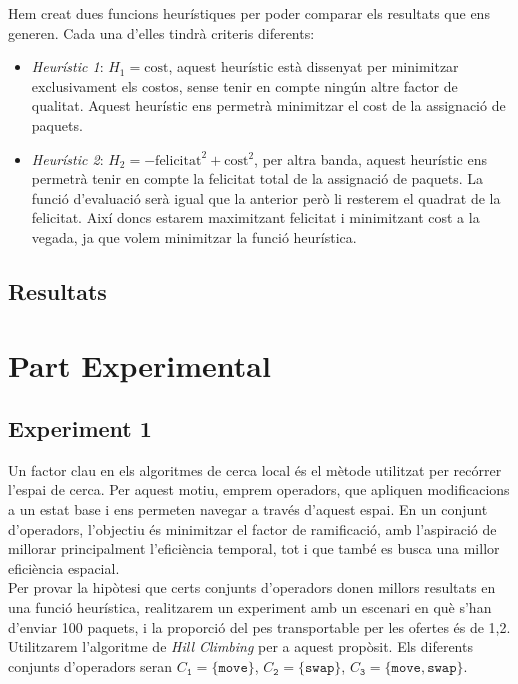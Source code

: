 \documentclass[a4paper]{article}
\begin{document}
	Hem creat dues funcions heurístiques per poder comparar els resultats que ens generen. Cada una d'elles tindrà criteris diferents:
	
	\begin{itemize}
		\item \emph{Heurístic 1}: $H_1 = \text{cost}$, aquest heurístic està dissenyat per minimitzar exclusivament els costos, sense tenir en compte ningún altre factor de qualitat. Aquest heurístic ens permetrà minimitzar el cost de la assignació de paquets.
		\item \emph{Heurístic 2}: $H_2 = -\text{felicitat}^2 + \text{cost}^2$, per altra banda, aquest heurístic ens permetrà tenir en compte la felicitat total de la assignació de paquets. La funció d'evaluació serà igual que la anterior però li resterem el quadrat de la  felicitat. Així doncs estarem maximitzant felicitat i minimitzant cost a la vegada, ja que volem minimitzar la funció heurística.
	\end{itemize}
	
	\subsection{Resultats}
	
	\newpage
	\section{Part Experimental}
	
	\subsection{Experiment 1}
	
	Un factor clau en els algoritmes de cerca local és el mètode utilitzat per recórrer l'espai de cerca. Per aquest motiu, emprem operadors, que apliquen modificacions a un estat base i ens permeten navegar a través d'aquest espai. En un conjunt d'operadors, l'objectiu és minimitzar el factor de ramificació, amb l'aspiració de millorar principalment l'eficiència temporal, tot i que també es busca una millor eficiència espacial. \\
	
	Per provar la hipòtesi que certs conjunts d'operadors donen millors resultats en una funció heurística, realitzarem un experiment amb un escenari en què s'han d'enviar 100 paquets, i la proporció del pes transportable per les ofertes és de 1,2. Utilitzarem l'algoritme de \textit{Hill Climbing} per a aquest propòsit. Els diferents conjunts d'operadors seran $C_{\texttt{1}} = \{\texttt{move}\}$, $C_{\texttt{2}} = \{\texttt{swap}\}$, $C_{\texttt{3}} = \{\texttt{move}, \texttt{swap}\}$. \\
	
\end{document}
